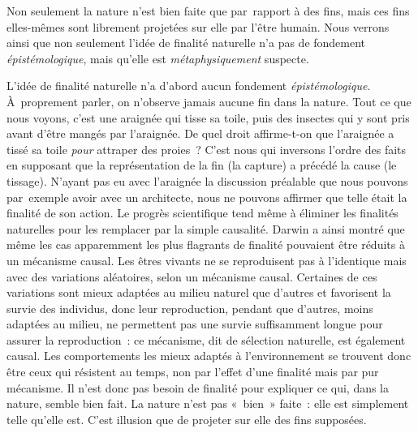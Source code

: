 \documentclass[a4paper,12pt]{article}
\begin{document}
Non seulement la nature n'est bien faite que
par rapport à des fins, mais ces fins elles-mêmes sont librement
projetées sur elle par l'être humain. Nous verrons ainsi que non
seulement l'idée de finalité naturelle n'a pas de fondement
\emph{épistémologique}​, mais qu'elle est \emph{métaphysiquement}​ suspecte.

L'idée de finalité naturelle n'a d'abord aucun fondement
\emph{épistémologique}​. À proprement parler, on n'observe
jamais aucune fin dans la nature. Tout ce que nous
voyons, c'est une araignée qui tisse sa toile, puis
des insectes qui y sont pris avant d'être mangés par l'araignée. De quel
droit affirme-t-on que l'araignée a tissé sa toile \emph{pour} attraper des
proies ? C'est nous qui inversons l'ordre des faits en supposant que la
représentation de la fin (la capture) a précédé la cause (le tissage).
N'ayant pas eu avec l'araignée la discussion préalable que nous pouvons
par exemple avoir avec un architecte, nous ne pouvons affirmer que telle
était la finalité de son action. Le progrès scientifique tend même à
éliminer les finalités naturelles pour les remplacer par la simple
causalité. Darwin a ainsi montré que même les cas
apparemment les plus flagrants de finalité pouvaient être réduits à un
mécanisme causal. Les êtres vivants ne se reproduisent pas à l'identique
mais avec des variations aléatoires, selon un mécanisme causal.
Certaines de ces variations sont mieux adaptées au milieu naturel que
d'autres et favorisent la survie des individus, donc leur reproduction,
pendant que d'autres, moins adaptées au milieu, ne permettent pas une
survie suffisamment longue pour assurer la reproduction : ce mécanisme,
dit de sélection naturelle, est également causal. Les comportements les
mieux adaptés à l'environnement se trouvent donc être ceux qui résistent
au temps, non par l'effet d'une finalité mais par pur mécanisme. Il
n'est donc pas besoin de finalité pour expliquer ce qui, dans la nature,
semble bien fait. La nature n'est pas « bien »
faite : elle est simplement telle qu'elle est. C'est illusion que de
projeter sur elle des fins supposées.
\end{document}
